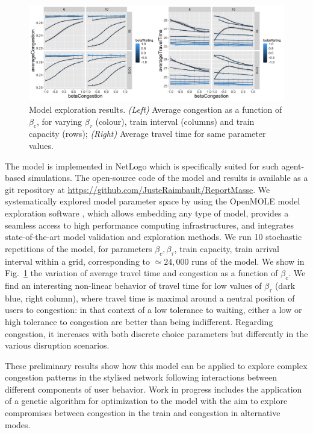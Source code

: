 \documentclass[3p,times,procedia]{elsarticle}
\begin{document}
\begin{figure}[t]\vspace*{4pt}
\centerline{\includegraphics[width=\linewidth]{figures/Fig3.png}}
\caption{Model exploration results. \textit{(Left)} Average congestion as a function of $\beta_c$, for varying $\beta_{\tau}$ (colour), train interval (columns) and train capacity (rows); \textit{(Right)} Average travel time for same parameter values.\label{fig:fig3}}
\end{figure}





The model is implemented in NetLogo which is specifically suited for such agent-based simulations. The open-source code of the model and results is available as a git repository at \url{https://github.com/JusteRaimbault/ReportMasse}. We systematically explored model parameter space by using the OpenMOLE model exploration software \citep{reuillon2013openmole}, which allows embedding any type of model, provides a seamless access to high performance computing infrastructures, and integrates state-of-the-art model validation and exploration methods. We run 10 stochastic repetitions of the model, for parameters $\beta_c,\beta_{\tau}$, train capacity, train arrival interval within a grid, corresponding to $\simeq 24,000$ runs of the model. We show in Fig.~\ref{fig:fig3} the variation of average travel time and congestion as a function of $\beta_c$. We find an interesting non-linear behavior of travel time for low values of $\beta_{\tau}$ (dark blue, right column), where travel time is maximal around a neutral position of users to congestion: in that context of a low tolerance to waiting, either a low or high tolerance to congestion are better than being indifferent. Regarding congestion, it increases with both discrete choice parameters but differently in the various disruption scenarios.

These preliminary results show how this model can be applied to explore complex congestion patterns in the stylised network following interactions between different components of user behavior. Work in progress includes the application of a genetic algorithm for optimization to the model with the aim to explore compromises between congestion in the train and congestion in alternative modes.
\end{document}

